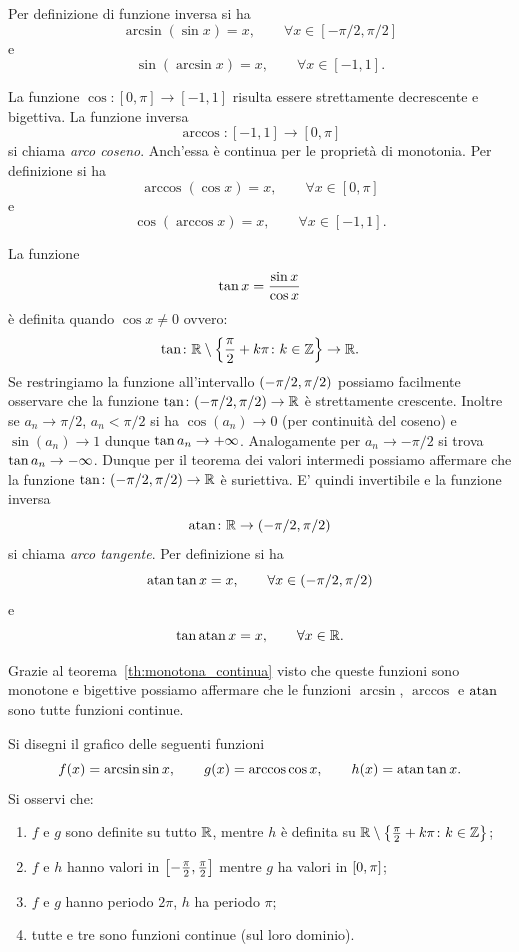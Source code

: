 Per definizione di funzione inversa si ha
\[
  \arcsin(\sin x) = x, \qquad \forall x \in [-\pi/2, \pi/2]
\]
e
\[
  \sin(\arcsin x) = x, \qquad \forall x \in [-1, 1].
\]

La funzione $\cos \colon[0,\pi] \to [-1,1]$ risulta essere strettamente
decrescente e bigettiva.
La funzione inversa
\[
  \arccos\colon[-1,1] \to [0,\pi]
\]
si chiama \emph{arco coseno}. 
Anch'essa è continua per le proprietà di monotonia.
Per definizione si ha
\[
  \arccos(\cos x) = x, \qquad \forall x \in [0,\pi]
\]
e
\[
    \cos(\arccos x) = x, \qquad \forall x \in [-1,1].
\]

La funzione
%
\[
\operatorname{tan} x = \frac{\sin x}{\cos x}
\]
è definita quando $\cos x\neq 0$ ovvero:
\[
  \operatorname{tan} \colon {\mathbb R} \setminus{\left\{ \frac \pi 2+ k\pi\colon k\in {\mathbb Z}\right\}} \to {\mathbb R}.
\]
Se restringiamo la funzione all'intervallo ${\left( -\pi/2, \pi/2 \right)}$ possiamo
facilmente osservare che la funzione $\operatorname{tan}\colon(-\pi/2,\pi/2)\to {\mathbb R}$ è strettamente crescente. Inoltre se $a_n \to \pi/2$, $a_n<\pi/2$ si ha $\cos(a_n)\to 0$ (per continuità del coseno) e $\sin(a_n)\to 1$ dunque $\operatorname{tan} a_n\to +\infty$. Analogamente per $a_n \to -\pi/2$ si trova $\operatorname{tan} a_n \to -\infty$. Dunque per il teorema dei valori intermedi possiamo affermare che la funzione $\operatorname{tan}\colon(-\pi/2,\pi/2)\to {\mathbb R}$ è suriettiva. E' quindi invertibile
e la funzione inversa
\[
  \operatorname{atan} \colon {\mathbb R} \to (-\pi/2,\pi/2)
\]
si chiama \emph{arco tangente}. Per definizione si ha
\[
  \operatorname{atan} \operatorname{tan} x = x, \qquad \forall x \in (-\pi/2, \pi/2)
\]
e
\[
  \operatorname{tan}\operatorname{atan} x = x, \qquad \forall x \in {\mathbb R}.
\]

Grazie al teorema~\ref{th:monotona_continua}
visto che queste funzioni sono monotone e bigettive
possiamo affermare che
le funzioni $\arcsin$, $\arccos$ e $\operatorname{atan}$ 
sono tutte funzioni continue.

\begin{exercise}
  Si disegni il grafico delle seguenti funzioni
  \[
    f(x) = \arcsin \sin x, \qquad 
    g(x) = \arccos \cos x, \qquad 
    h(x) = \operatorname{atan} \operatorname{tan} x.
  \]
  Si osservi che:
  \begin{enumerate} 
    \item $f$ e $g$ sono definite su tutto ${\mathbb R}$,
  mentre $h$ è definita su ${\mathbb R}\setminus{\left\{ \frac{\pi}2+k\pi\colon k\in {\mathbb Z}\right\}}$;
    \item $f$ e $h$ hanno valori 
  in $\left[-\frac \pi 2,\frac \pi 2\right]$
  mentre $g$ ha valori in $\left[0,\pi\right]$;
    \item $f$ e $g$ hanno periodo $2\pi$,
  $h$ ha periodo $\pi$;
    \item tutte e tre sono funzioni continue (sul loro dominio).
  \end{enumerate}
\end{exercise}

